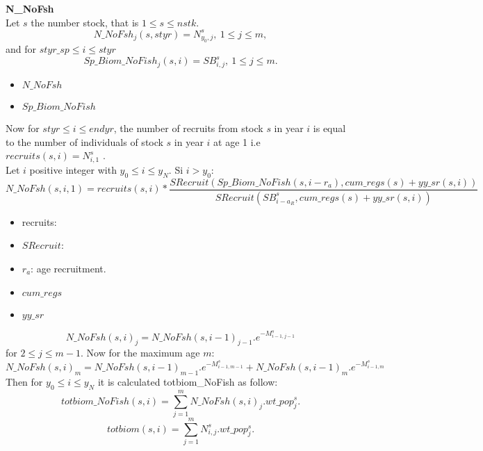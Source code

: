 \documentclass{article}
\begin{document}
\textbf{N\_NoFsh}\\
Let $s$ the number stock,  that is $1\leq s \leq nstk$.
\begin{equation}
N\_NoFsh_j(s,styr)=N^s_{y_0,j}, \ 1\leq j \leq m,
\end{equation}
and for $styr\_sp \leq i \leq styr$ 
\begin{equation}
    Sp\_Biom\_NoFish_j(s,i)=SB^s_{i,j}, \ 1\leq j \leq m.
\end{equation}
\begin{itemize}
    \item $N\_NoFsh$
    \item $Sp\_Biom\_NoFish$
    
\end{itemize}
Now for $styr\leq i \leq endyr$, the number of recruits from stock $s$ in year $i$ is equal to the number of individuals of stock $s$ in year $i$ at age 1 i.e $recruits(s,i)=N^s_{i,1}$ .\\ Let $i$ positive integer with $y_0\leq i \leq y_N$.
Si $i>y_0$:
\begin{equation}
    N\_NoFsh(s,i,1)=recruits(s,i)*\dfrac{SRecruit(Sp\_Biom\_NoFish(s,i-r_a),cum\_regs(s)+yy\_sr(s,i))}{SRecruit(SB^s_{i-a_R},cum\_regs(s)+yy\_sr(s,i))}
\end{equation}
\begin{itemize}
    \item recruits:
    \item $SRecruit$:
    \item $r_a$: age recruitment.
    \item $cum\_regs$
    \item $yy\_sr$
\end{itemize}
\begin{equation}
    N\_NoFsh(s,i)_j=N\_NoFsh(s,i-1)_{j-1}.e^{-M^s_{i-1, j-1}}
\end{equation}
for $2\leq j \leq m-1.$ Now for the maximum age $m$:
\begin{equation}
    N\_NoFsh(s,i)_m=N\_NoFsh(s,i-1)_{m-1}.e^{-M^s_{i-1,m-1}}+N\_NoFsh(s,i-1)_m.e^{-M^s_{i-1,m}}
\end{equation}
Then for $ y_0\leq i \leq y_N$ it is calculated totbiom\_NoFish as follow:
\begin{equation}
    totbiom\_NoFish(s,i)=\sum_{j=1}^mN\_NoFsh(s,i)_j.wt\_pop^s_j.
\end{equation}
\begin{equation}
    totbiom(s,i)=\sum_{j=1}^mN^s_{i,j}.wt\_pop^s_j.
\end{equation}
\end{document}
